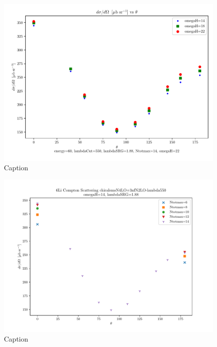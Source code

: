 \documentclass[a4paper,11pt]{article}
\begin{document}
\begin{figure}[H]
  \centering
  \includegraphics[scale=0.5]{6Li-omegaH-vary.pdf}
  \caption{Caption}
  \label{fig:label1}
\end{figure}

\begin{figure}[H]
  \centering
  \includegraphics[scale=0.5]{6Li-Ntotmax-vary-omegaH14.pdf}
  \caption{Caption}
  \label{fig:label2}
\end{figure}
\end{document}
